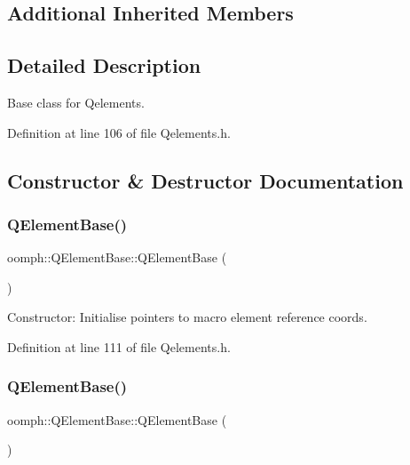 \subsection*{Additional Inherited Members}


\subsection{Detailed Description}
Base class for Qelements. 

Definition at line 106 of file Qelements.\+h.



\subsection{Constructor \& Destructor Documentation}
\mbox{\label{classoomph_1_1QElementBase_a2862932b7cda1fc8a8ea445b0ae15473}} 
\subsubsection{\texorpdfstring{Q\+Element\+Base()}{QElementBase()}\hspace{0.1cm}{\footnotesize\ttfamily [1/2]}}
{\footnotesize\ttfamily oomph\+::\+Q\+Element\+Base\+::\+Q\+Element\+Base (\begin{DoxyParamCaption}{ }\end{DoxyParamCaption})\hspace{0.3cm}{\ttfamily [inline]}}



Constructor\+: Initialise pointers to macro element reference coords. 



Definition at line 111 of file Qelements.\+h.

\mbox{\label{classoomph_1_1QElementBase_ae2f375a4476a7f555a1ac68f0f0fe0e0}} 
\subsubsection{\texorpdfstring{Q\+Element\+Base()}{QElementBase()}\hspace{0.1cm}{\footnotesize\ttfamily [2/2]}}
{\footnotesize\ttfamily oomph\+::\+Q\+Element\+Base\+::\+Q\+Element\+Base (\begin{DoxyParamCaption}\item[{const \hyperlink{classoomph_1_1QElementBase}{Q\+Element\+Base} \&}]{ }\end{DoxyParamCaption})\hspace{0.3cm}{\ttfamily [inline]}}



